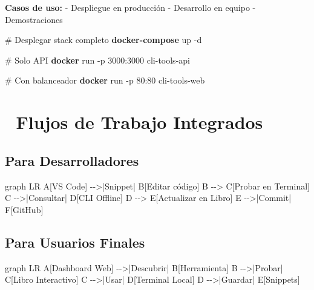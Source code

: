\documentclass[
  11pt,
  letterpaper,
  oneside,
  openany]{scrbook}
\newenvironment{Shaded}{}{}
\newcommand{\AttributeTok}[1]{\textcolor[rgb]{0.84,0.23,0.29}{#1}}
\newcommand{\CommentTok}[1]{\textcolor[rgb]{0.42,0.45,0.49}{#1}}
\newcommand{\ExtensionTok}[1]{\textcolor[rgb]{0.84,0.23,0.29}{\textbf{#1}}}
\newcommand{\NormalTok}[1]{\textcolor[rgb]{0.14,0.16,0.18}{#1}}
\begin{document}
\textbf{Casos de uso:} - Despliegue en producción - Desarrollo en equipo
- Demostraciones

\begin{Shaded}
\begin{Highlighting}[]
\CommentTok{\# Desplegar stack completo}
\ExtensionTok{docker{-}compose}\NormalTok{ up }\AttributeTok{{-}d}

\CommentTok{\# Solo API}
\ExtensionTok{docker}\NormalTok{ run }\AttributeTok{{-}p}\NormalTok{ 3000:3000 cli{-}tools{-}api}

\CommentTok{\# Con balanceador}
\ExtensionTok{docker}\NormalTok{ run }\AttributeTok{{-}p}\NormalTok{ 80:80 cli{-}tools{-}web}
\end{Highlighting}
\end{Shaded}

\section{🔄 Flujos de Trabajo
Integrados}\label{flujos-de-trabajo-integrados}

\subsection{Para Desarrolladores}\label{para-desarrolladores}

\begin{Shaded}
\begin{Highlighting}[]
\NormalTok{graph LR}
\NormalTok{    A[VS Code] {-}{-}\textgreater{}|Snippet| B[Editar código]}
\NormalTok{    B {-}{-}\textgreater{} C[Probar en Terminal]}
\NormalTok{    C {-}{-}\textgreater{}|Consultar| D[CLI Offline]}
\NormalTok{    D {-}{-}\textgreater{} E[Actualizar en Libro]}
\NormalTok{    E {-}{-}\textgreater{}|Commit| F[GitHub]}
\end{Highlighting}
\end{Shaded}

\subsection{Para Usuarios Finales}\label{para-usuarios-finales}

\begin{Shaded}
\begin{Highlighting}[]
\NormalTok{graph LR}
\NormalTok{    A[Dashboard Web] {-}{-}\textgreater{}|Descubrir| B[Herramienta]}
\NormalTok{    B {-}{-}\textgreater{}|Probar| C[Libro Interactivo]}
\NormalTok{    C {-}{-}\textgreater{}|Usar| D[Terminal Local]}
\NormalTok{    D {-}{-}\textgreater{}|Guardar| E[Snippets]}
\end{Highlighting}
\end{Shaded}
\end{document}
